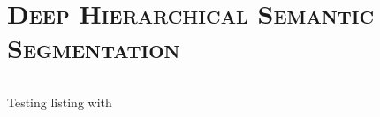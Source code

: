 \section*{\scshape\textbf{Deep Hierarchical Semantic Segmentation}}

  \begin{listing}[!ht]
    \inputminted[breaklines, fontfamily=SourceSansPro-TLF]{cpp}{../src/competitive_template.cpp}
    \caption{Testing  listing with }
    \label{master_service}
  \end{listing}

